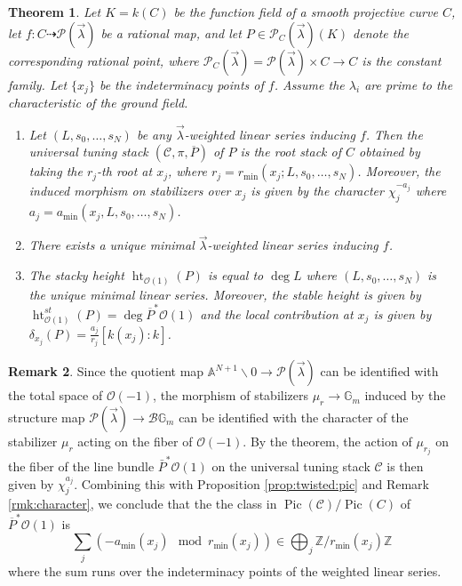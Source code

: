 \documentclass[a4paper,12pt]{amsart}
\newtheorem{thm}{Theorem}[section]
\theoremstyle{definition}
\newtheorem{rmk}[thm]{Remark}
\newcommand{\bG}{\mathbb{G}}
\newcommand{\bA}{\mathbb{A}}
\newcommand{\cO}{\mathcal{O}}
\newcommand{\cC}{\mathcal{C}}
\DeclareMathOperator{\height}{ht}
\newcommand{\Pcv}{\mathcal{P}(\vec{\lambda})}
\newcommand{\Pc}{\mathcal{P}}
\newcommand{\lambdavec}{{\vec{\lambda}}}
\newcommand{\Z}{\mathbb{Z}}
\DeclareMathOperator{\Pic}{Pic}
\renewcommand{\setminus}{\smallsetminus}
\begin{document}
	\begin{thm}\label{thm:tuning-stacks-and-minimal-linear-series}
		Let $K=k(C)$ be the function field of a smooth projective curve $C$, let $f\colon C\dasharrow\Pcv$ be a rational map, and let $P\in\Pc_{C}(\vec\lambda)(K)$ denote the corresponding rational point, where $\Pc_{C}(\vec\lambda)=\Pcv\times C\to C$ is the constant family. Let $\{x_j\}$ be the indeterminacy points of $f$. Assume the $\lambda_i$ are prime to the characteristic of the ground field.
		
		\begin{enumerate}
			\item\label{thm:tuning-stacks-and-minimal-linear-series::tuning-stack} Let $(L,s_0,\dots,s_N)$ be any $\lambdavec$-weighted linear series inducing $f$. Then the universal tuning stack $(\cC,\pi,\overline{P})$ of $P$ is the root stack of $C$ obtained by taking the $r_j$-th root at $x_j$, where $r_j=r_{\min}(x_j;L,s_0,\dots,s_N)$. Moreover, the induced morphism on stabilizers over $x_j$ is given by the character $\chi_j^{-a_j}$ where $a_j = a_{\min}(x_j, L, s_0, \ldots, s_N)$. 
			
			\item\label{thm:tuning-stacks-and-minimal-linear-series::minimal-lin-ser} There exists a unique minimal $\lambdavec$-weighted linear series inducing $f$.
			
			\item\label{thm:tuning-stacks-and-minimal-linear-series::height} The stacky height $\height_{\cO(1)}(P)$ is equal to $\deg L$ where $(L, s_0, \dots, s_N)$ is the unique minimal linear series. Moreover, the stable height is given by $\height_{\cO(1)}^{st}(P) = \deg \overline{P}^*\cO(1)$ and the local contribution at $x_j$ is given by $\delta_{x_j}(P) = \frac{a_j}{r_j}[k(x_j):k]$. 
		\end{enumerate}
	\end{thm}
	
	\begin{rmk} Since the quotient map $\bA^{N + 1} \setminus 0 \to \Pcv$ can be identified with the total space of $\cO(-1)$, the morphism of stabilizers $\mu_r \to \bG_m$ induced by the structure map $\Pcv \to \mathcal{B} \bG_m$ can be identified with the character of the stabilizer $\mu_r$ acting on the fiber of $\cO(-1)$. By the theorem, the action of $\mu_{r_j}$ on the fiber of the line bundle $\bar{P}^*\cO(1)$ on the universal tuning stack $\cC$ is then given by $\chi_j^{a_j}$. Combining this with Proposition \ref{prop:twisted:pic} and Remark \ref{rmk:character}, we conclude that the the class in $\Pic(\cC)/\Pic(C)$ of $\overline{P}^*\cO(1)$ is
		$$
		\sum _j (-a_{\min}(x_j) \mod r_{\min}(x_j)) \in \bigoplus_j \Z/r_{\min}(x_j)\Z
		$$
		where the sum runs over the indeterminacy points of the weighted linear series.    
	\end{rmk}
	
\end{document}
